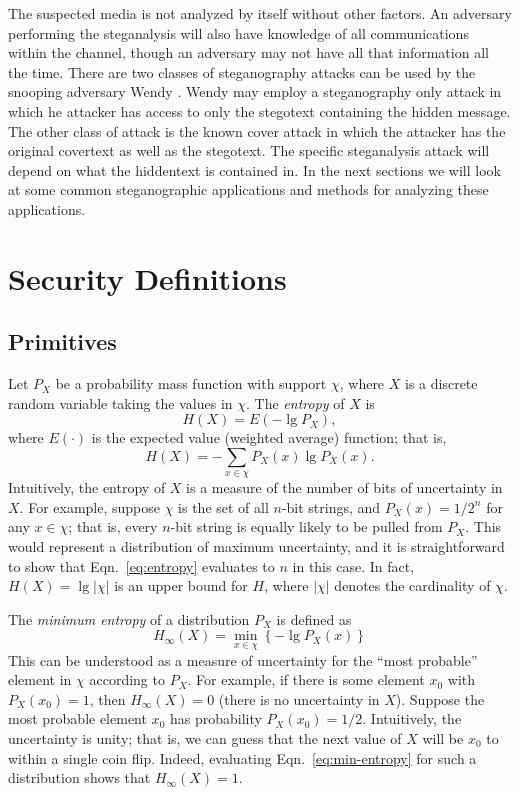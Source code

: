 \documentclass[11pt]{article}
\renewcommand\l{\mathopen{}\left}
\renewcommand\r{\right}
\newcommand\abs[1]{\l\vert #1 \r\vert}
\begin{document}
The suspected media is not analyzed by itself without other factors.
An adversary performing the steganalysis will also have knowledge of
all communications within the channel, though an adversary may not
have all that information all the time. There are two classes of
steganography attacks can be used by the snooping adversary Wendy
\cite{Das}.
Wendy may employ a steganography only attack in which he attacker has
access to only the stegotext containing the hidden message. The other
class of attack is the known cover attack in which the attacker has
the original covertext as well as the stegotext. The specific
steganalysis attack will depend on what the hiddentext is contained
in. In the next sections we will look at some common steganographic
applications and methods for analyzing these applications.

\section{Security Definitions}
\subsection{Primitives}
Let $P_X$ be a probability mass function with support $\chi$, where $X$
is a discrete random variable taking the values in $\chi$. The
\emph{entropy} of $X$ is
\begin{equation*}
  H(X) = E\l( -\lg P_X \r),
\end{equation*}
where $E(\cdot)$ is the expected value (weighted average) function;
that is,
\begin{equation}
  H(X) = - \sum_{x\in \chi} P_X(x) \lg P_X(x).
  \label{eq:entropy}
\end{equation}
Intuitively, the entropy of $X$ is a measure of the number of bits of
uncertainty in $X$. For example, suppose $\chi$ is the set of all
$n$-bit strings, and $P_X(x) = 1 / 2^n$ for any $x \in \chi$; that
is, every $n$-bit string is equally likely to be pulled from $P_X$.
This would represent a distribution of maximum uncertainty, and it is
straightforward to show that Eqn.~\eqref{eq:entropy} evaluates to $n$
in this case. In fact, $H(X) = \lg \abs{\chi}$ is an upper bound for
$H$, where $\abs \chi$ denotes the cardinality of $\chi$.

The \emph{minimum entropy} of a distribution $P_X$ is defined as
\begin{equation}
  H_\infty\l( X \r) = \min_{x \in \chi} \l\{ -\lg P_X(x) \r\}
  \label{eq:min-entropy}
\end{equation}
This can be understood as a measure of uncertainty for the ``most
probable'' element in $\chi$ according to $P_X$. For example, if there
is some element $x_0$ with $P_X(x_0) = 1$, then $H_\infty(X) = 0$
(there is no uncertainty in $X$). Suppose the most probable element
$x_0$ has probability $P_X(x_0) = 1/2$. Intuitively, the uncertainty
is unity; that is, we can guess that the next value of $X$ will be
$x_0$ to within a single coin flip. Indeed, evaluating
Eqn.~\eqref{eq:min-entropy} for such a distribution shows that
$H_\infty\l( X \r) = 1$.
\end{document}

